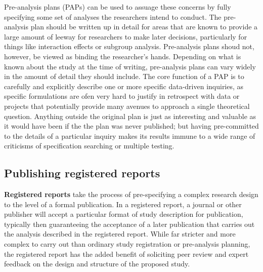 Pre-analysis plans (PAPs) can be used to assuage these concerns
by fully specifying some set of analyses the researchers intend to conduct.
The pre-analysis plan should be written up in detail
for areas that are known to provide a large amount of leeway
for researchers to make later decisions,
particularly for things like interaction effects or subgroup analysis.
Pre-analysis plans shoud not, however, be viewed as binding the researcher's hands.\cite{olken2015promises}
Depending on what is known about the study at the time of writing,
pre-analysis plans can vary widely in the amount of detail they should include.
The core function of a PAP is to carefully and explicitly describe
one or more specific data-driven inquiries,
as specific formulations are ofen very hard to justify in retrospect
with data or projects that potentially provide many avenues to approach
a single theoretical question.
Anything outside the original plan is just as interesting and valuable
as it would have been if the the plan was never published;
but having pre-committed to the details of a particular inquiry makes its results
immune to a wide range of criticisms of specification searching or multiple testing.\cite{duflo2020praise}


\subsection{Publishing registered reports}

\textbf{Registered reports}
take the process of pre-specifying a complex research design
to the level of a formal publication.
In a registered report, a journal or other publisher
will accept a particular format of study description for publication,
typically then guaranteeing the acceptance of a later publication
that carries out the analysis described in the registered report.
While far stricter and more complex to carry out than
ordinary study registration or pre-analysis planning,
the registered report has the added benefit
of soliciting peer review and expert feedback
on the design and structure of the proposed study.


